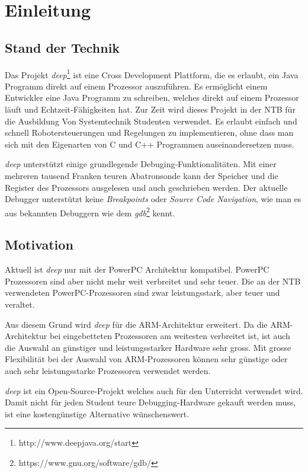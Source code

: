 \chapter{Einleitung}


\section{Stand der Technik}
Das Projekt \textit{deep}\footnote{http://www.deepjava.org/start} ist eine Cross Development Plattform, die es erlaubt, ein Java Programm direkt auf einem Prozessor auszuführen.
Es ermöglicht einem Entwickler eine Java Programm zu schreiben, welches direkt auf einem Prozessor läuft und Echtzeit-Fähigkeiten hat.
Zur Zeit wird dieses Projekt in der NTB für die Ausbildung Von Systemtechnik Studenten verwendet.
Es erlaubt einfach und schnell Robotersteuerungen und Regelungen zu implementieren, ohne dass man sich mit den Eigenarten von C und C++ Programmen auseinandersetzen muss.

\textit{deep} unterstützt einige grundlegende Debuging-Funktionalitäten.
Mit einer mehreren tausend Franken teuren Abatronsonde kann der Speicher und die Register des Prozessors ausgelesen und auch geschrieben werden.
Der aktuelle Debugger unterstützt keine \textit{Breakpoints} oder \textit{Source Code Navigation}, wie man es aus bekannten Debuggern wie dem \textit{gdb}\footnote{https://www.gnu.org/software/gdb/} kennt.



\section{Motivation}
Aktuell ist \textit{deep} nur mit der PowerPC Architektur kompatibel.
PowerPC Prozessoren sind aber nicht mehr weit verbreitet und sehr teuer.
Die an der NTB verwendeten PowerPC-Prozessoren sind zwar leistungsstark, aber teuer und veraltet.

Aus diesem Grund wird \textit{deep} für die ARM-Architektur erweitert.
Da die ARM-Architektur bei eingebetteten Prozessoren am weitesten verbreitet ist, ist auch die Auswahl an günstiger und leistungsstarker Hardware sehr gross.
Mit grosse Flexibilität bei der Auswahl von ARM-Prozessoren können sehr günstige oder auch sehr leistungsstarke Prozessoren verwendet werden.

\textit{deep} ist ein Open-Source-Projekt welches auch für den Unterricht verwendet wird.
Damit nicht für jeden Student teure Debugging-Hardware gekauft werden muss, ist eine kostengünstige Alternative wünschenswert.

